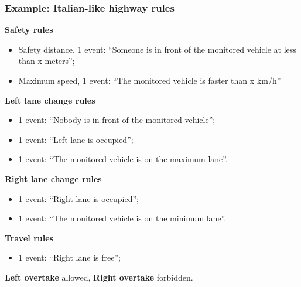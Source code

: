 \documentclass{beamer}
\begin{document}
\begin{frame}
\frametitle{Example: Italian-like highway rules}
\textbf{Safety rules}\\
\begin{itemize}
\item Safety distance, 1 event: ``Someone is in front of the monitored vehicle at less than x meters'';
\item Maximum speed, 1 event: ``The monitored vehicle is faster than x km/h''
\end{itemize}

\textbf{Left lane change rules}
\begin{itemize}
\item 1 event: ``Nobody is in front of the monitored vehicle'';
\item 1 event: ``Left lane is occupied'';
\item 1 event: ``The monitored vehicle is on the maximum lane''.
\end{itemize}

\textbf{Right lane change rules}
\begin{itemize}
\item 1 event: ``Right lane is occupied'';
\item 1 event: ``The monitored vehicle is on the minimum lane''.
\end{itemize}

\textbf{Travel rules}
\begin{itemize}
\item 1 event: ``Right lane is free'';
\end{itemize}

\textbf{Left overtake} allowed, \textbf{Right overtake} forbidden.

\end{frame}
\end{document}
